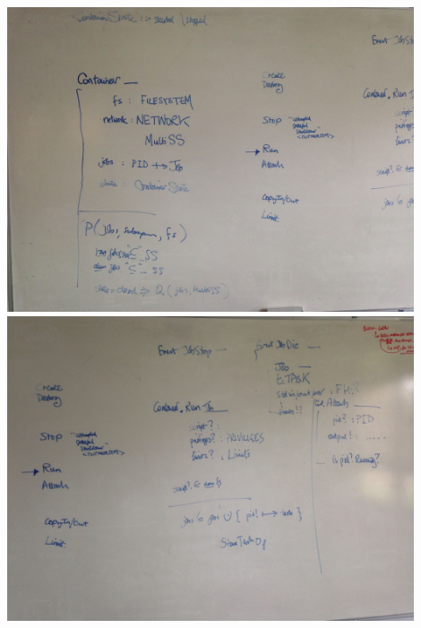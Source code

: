 \documentclass[a4paper,twoside,12pt]{article}
\begin{document}
\includegraphics[width=0.9\textwidth]{pics/IMG_0685.jpg}\\
\includegraphics[width=0.9\textwidth]{pics/IMG_0686.jpg}\\
\end{document}
